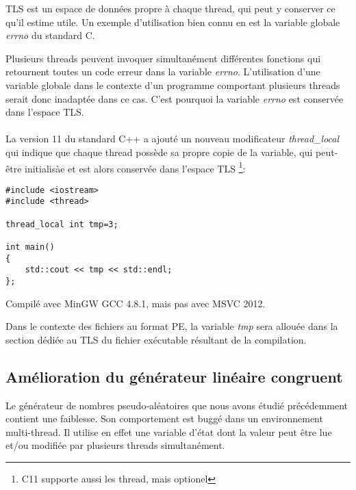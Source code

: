 ﻿
\label{TLS}

TLS est un espace de données propre à chaque thread, qui peut y conserver ce qu'il estime utile.
Un exemple d'utilisation bien connu en est la variable globale \emph{errno} du standard C.

Plusieurs threads peuvent invoquer simultanément différentes fonctions qui retournent toutes un code 
erreur dans la variable \emph{errno}. L'utilisation d'une variable globale dans le contexte d'un 
programme comportant plusieurs threads serait donc inadaptée dans ce cas. C'est pourquoi la variable 
\emph{errno} est conservée dans l'espace \ac{TLS}.\\
\\
La version 11 du standard C++ a ajouté un nouveau modificateur \emph{thread\_local} qui indique que 
chaque thread possède sa propre copie de la variable, qui peut-être initialisàe et est
alors conservée dans l'espace \ac{TLS}
\footnote{ C11 supporte aussi les thread, mais optionel}:

\begin{lstlisting}[caption=C++11,style=customc]
#include <iostream>
#include <thread>

thread_local int tmp=3;

int main()
{
	std::cout << tmp << std::endl;
};
\end{lstlisting}

Compilé avec MinGW GCC 4.8.1, mais pas avec MSVC 2012.

Dans le contexte des fichiers au format PE, la variable \emph{tmp} sera allouée dans la section dédiée 
au \ac{TLS} du fichier exécutable résultant de la compilation.

\subsection{Amélioration du générateur linéaire congruent}
\label{LCG_TLS}

Le générateur de nombres pseudo-aléatoires  que nous avons étudié précédemment 
contient une faiblesse. Son comportement est buggé dans un environnement multi-thread. Il utilise 
en effet une variable d'état dont la valeur peut être lue et/ou modifiée par plusieurs threads 
simultanément.




